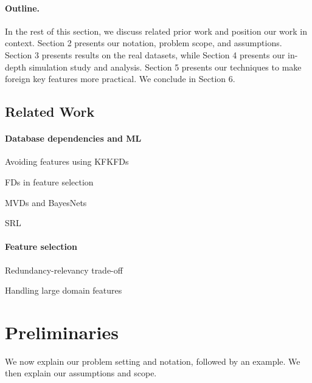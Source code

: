 \documentclass[sigconf]{acmart}
\begin{document}
\paragraph*{Outline.} In the rest of this section, we discuss related prior work and position our work in context. Section 2 presents our notation, problem scope, and assumptions. 
Section 3 presents results on the real datasets, while Section 4 presents our in-depth simulation study and analysis. Section 5 presents our techniques to make foreign key features
more practical. We conclude in Section 6.

\subsection*{Related Work}

\paragraph*{Database dependencies and ML}

Avoiding features using KFKFDs

FDs in feature selection

MVDs and BayesNets

SRL

\paragraph*{Feature selection}

Redundancy-relevancy trade-off

Handling large domain features


\section{Preliminaries}
We now explain our problem setting and notation, followed by an example. We then explain our assumptions and scope.
\end{document}
